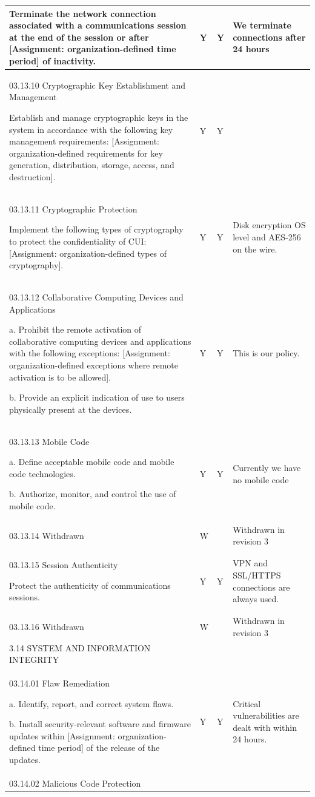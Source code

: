 \begin{longtable} {|p{}|p{}|p{}|p{} |}
{Terminate the network connection associated with a communications session at the end of the session or after [Assignment: organization-defined time period] of inactivity.}&{Y}&{Y}&{We terminate connections after 24 hours} \\ \hline
{03.13.10 Cryptographic Key Establishment and Management

Establish and manage cryptographic keys in the system in accordance with the following key management requirements: [Assignment: organization-defined requirements for key generation, distribution, storage, access, and destruction].}&{Y}&{Y}& \\ \hline
{03.13.11 Cryptographic Protection

Implement the following types of cryptography to protect the confidentiality of CUI: [Assignment: organization-defined types of cryptography].}&{Y}&{Y}&{Disk encryption OS level and AES-256 on the wire.} \\ \hline
{03.13.12 Collaborative Computing Devices and Applications

a. Prohibit the remote activation of collaborative computing devices and applications with the following exceptions: [Assignment: organization-defined exceptions where remote activation is to be allowed].

b. Provide an explicit indication of use to users physically present at the devices.}&{Y}&{Y}&{This is our policy. } \\ \hline
{03.13.13 Mobile Code

a. Define acceptable mobile code and mobile code technologies.

b. Authorize, monitor, and control the use of mobile code.}&{Y}&{Y}&{Currently we have no mobile code} \\ \hline
{03.13.14 Withdrawn}&{W}&{}&{Withdrawn in revision 3} \\ \hline
{03.13.15 Session Authenticity

Protect the authenticity of communications sessions.}&{Y}&{Y}&{VPN and SSL/HTTPS connections are always used.} \\ \hline
{03.13.16 Withdrawn}&{W}&{}&{Withdrawn in revision 3} \\ \hline
{3.14 SYSTEM AND INFORMATION INTEGRITY}&&& \\ \hline
{03.14.01 Flaw Remediation

a. Identify, report, and correct system flaws.

b. Install security-relevant software and firmware updates within [Assignment: organization-defined time period] of the release of the updates.}&{Y}&{Y}&{Critical vulnerabilities are dealt with within 24 hours.} \\ \hline
{03.14.02 Malicious Code Protection

}
\end{longtable}
